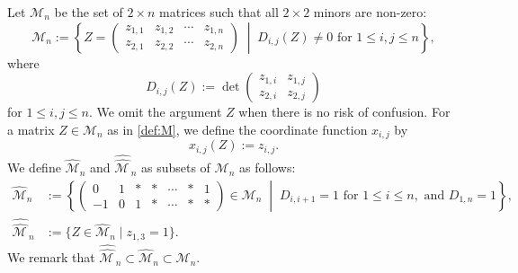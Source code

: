 \documentclass[11pt]{amsart}
\theoremstyle{plain}
\theoremstyle{definition}
\theoremstyle{remark}
\begin{document}
Let $\mathcal{M}_n$ be the set of $2 \times n$ matrices such that all $2 \times 2$
minors are non-zero:
\begin{equation}
\mathcal{M}_n :=
\left\{
    Z=\begin{pmatrix}
        z_{1,1} & z_{1,2}  & \cdots & z_{1,n}\\
        z_{2,1} & z_{2,2}& \cdots & z_{2,n}
    \end{pmatrix}
    \;\middle|\; D_{i, j}(Z)\ne 0 \text{ for } 1\leq i, j\leq n
    \right\}, \label{def:M}
\end{equation}
where
\begin{equation}
D_{i,j}(Z) := \det
\begin{pmatrix}
z_{1,i} & z_{1,j}\\
z_{2,i} & z_{2,j}
\end{pmatrix} \label{dfn:Dij}
\end{equation}
for $1 \leq i, j \leq n$.
We omit the argument $Z$ when there is no risk of confusion.
For a matrix $Z\in\mathcal{M}_{n}$ as in \eqref{def:M}, we define the coordinate function
$x_{i,j}$ by
\begin{equation}
    x_{i,j}(Z):=z_{i,j}. \label{def:coordinateFunc}
\end{equation}
We define $\widehat{\mathcal{M}}_n$ and $\widehat{\widehat{\mathcal{M\,}}}_n$ as subsets of $\mathcal{M}_n$ as follows:
\begin{align}
    \widehat{\mathcal{M}}_n &:= \left\{
    \begin{pmatrix}
        0 & 1 & * & * & \cdots & * & 1 \\
        -1 & 0 & 1 & * & \cdots & * & *
    \end{pmatrix}\in
    \mathcal{M}_{n}
    \;\middle|\; D_{i,i+1} = 1 \text{ for } 1 \leq i \leq n, \text{ and }
    D_{1,n} = 1
    \right\}, \label{def:hatM}\\
    \widehat{\widehat{\mathcal{M\,}}}_{n} &:= \{ Z \in \widehat{\mathcal{M}}_n
    \mid z_{1,3} = 1 \}. \label{def:hatM'}
\end{align}
We remark that $\widehat{\widehat{\mathcal{M\,}}}_{n} \subset \widehat{\mathcal{M}}_n \subset \mathcal{M}_n$.
\end{document}
